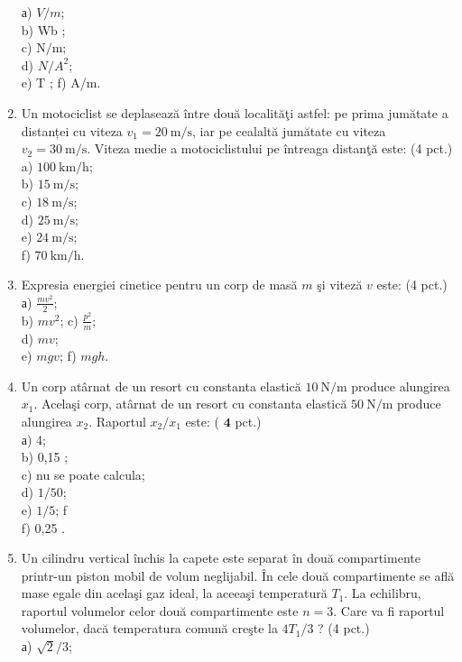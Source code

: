 \begin{enumerate}
а) $V / m$;\\
b) Wb ;\\
c) $\mathrm{N} / \mathrm{m}$;\\
d) $N / A^{2}$;\\
e) T ; f) A/m.
  \item Un motociclist se deplasează între două localităţi astfel: pe prima jumătate a distanței cu viteza $v_{1}=20 \mathrm{~m} / \mathrm{s}$, iar pe cealaltă jumătate cu viteza $v_{2}=30 \mathrm{~m} / \mathrm{s}$. Viteza medie a motociclistului pe întreaga distanţă este: (4 pct.)\\
a) $100 \mathrm{~km} / \mathrm{h}$;\\
b) $15 \mathrm{~m} / \mathrm{s}$;\\
c) $18 \mathrm{~m} / \mathrm{s}$;\\
d) $25 \mathrm{~m} / \mathrm{s}$;\\
e) $24 \mathrm{~m} / \mathrm{s}$;\\
f) $70 \mathrm{~km} / \mathrm{h}$.
  \item Expresia energiei cinetice pentru un corp de masă $m$ şi viteză $v$ este: (4 pct.)\\
а) $\frac{m v^{2}}{2}$;\\
b) $m v^{2}$; c) $\frac{p^{2}}{m}$;\\
d) $m v$;\\
e) $m g v$; f) $m g h$.
  \item Un corp atârnat de un resort cu constanta elastică $10 \mathrm{~N} / \mathrm{m}$ produce alungirea $x_{1}$. Acelaşi corp, atârnat de un resort cu constanta elastică $50 \mathrm{~N} / \mathrm{m}$ produce alungirea $x_{2}$. Raportul $x_{2} / x_{1}$ este: ( $\mathbf{4}$ pct.)\\
а) 4;\\
b) 0,15 ;\\
c) nu se poate calcula;\\
d) $1 / 50$;\\
e) $1 / 5$; f\\
f) 0,25 .
  \item Un cilindru vertical închis la capete este separat în două compartimente printr-un piston mobil de volum neglijabil. În cele două compartimente se află mase egale din acelaşi gaz ideal, la aceeaşi temperatură $T_{1}$. La echilibru, raportul volumelor celor două compartimente este $n=3$. Care va fi raportul volumelor, dacă temperatura comună creşte la $4 T_{1} / 3$ ? (4 pct.)\\
а) $\sqrt{2} / 3$;\\

\end{enumerate}
